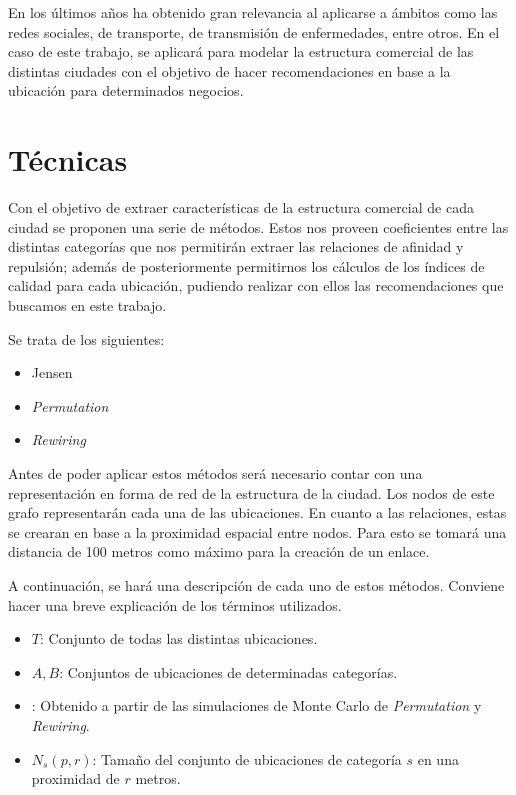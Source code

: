 En los últimos años ha obtenido gran relevancia al aplicarse a ámbitos como las redes sociales, de transporte, de transmisión de enfermedades, entre otros. En el caso de este trabajo, se aplicará para modelar la estructura comercial de las distintas ciudades con el objetivo de hacer recomendaciones en base a la ubicación para determinados negocios.


%


\section{Técnicas}
Con el objetivo de extraer características de la estructura comercial de cada ciudad se proponen una serie de métodos. Estos nos proveen coeficientes entre las distintas categorías que nos permitirán extraer las relaciones de afinidad y repulsión; además de posteriormente permitirnos los cálculos de los índices de calidad para cada ubicación, pudiendo realizar con ellos las recomendaciones que buscamos en este trabajo.

Se trata de los siguientes:
\begin{itemize}
	\item Jensen
	\item \textit{Permutation}
	\item \textit{Rewiring}
\end{itemize}


Antes de poder aplicar estos métodos será necesario contar con una representación en forma de red de la estructura de la ciudad. Los nodos de este grafo representarán cada una de las ubicaciones. En cuanto a las relaciones, estas se crearan en base a la proximidad espacial entre nodos. Para esto se tomará una distancia de 100 metros como máximo para la creación de un enlace.

A continuación, se hará una descripción de cada uno de estos métodos. Conviene hacer una
breve explicación de los términos utilizados.
\begin{itemize}
	\item $T$: Conjunto de todas las distintas ubicaciones.
	\item $A,B$: Conjuntos de ubicaciones de determinadas categorías.
	\item {}: Obtenido a partir de las simulaciones de Monte Carlo de \textit{Permutation} y \textit{Rewiring}.
	\item $N_s(p,r)$: Tamaño del conjunto de ubicaciones de categoría $s$ en una proximidad de $r$ metros.
\end{itemize}

